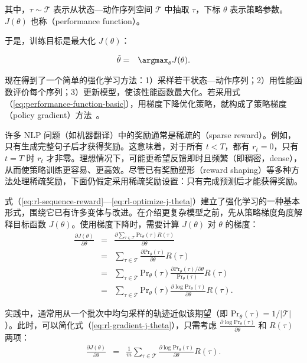 \noindent 其中，$\tau \sim \mathcal{T}$ 表示从状态—动作序列空间 $\mathcal{T}$ 中抽取 $\tau$，下标 $\theta$ 表示策略参数。$J(\theta)$ 也称（performance function）。

于是，训练目标是最大化 $J(\theta)$：

\begin{eqnarray}
\tilde{\theta} & = & \argmax_{\theta} J(\theta). \label{eq:rl-optimize-j-theta}
\end{eqnarray}

现在得到了一个简单的强化学习方法：1）采样若干状态—动作序列；2）用性能函数评价每个序列；3）更新模型，使该性能函数最大化。若采用式（\ref{eq:performance-function-basic}），用梯度下降优化策略，就构成了策略梯度（policy gradient）方法~\cite{williams:1992simple}。

许多 NLP 问题（如机器翻译）中的奖励通常是稀疏的（sparse reward）。例如，只有生成完整句子后才获得奖励。这意味着，对于所有 $t < T$，都有 $r_t = 0$，只有 $t = T$ 时 $r_t$ 才非零。理想情况下，可能更希望反馈即时且频繁（即稠密，dense），从而使策略训练更容易、更高效。尽管已有奖励塑形（reward shaping）等多种方法处理稀疏奖励，下面仍假定采用稀疏奖励设置：只有完成预测后才能获得奖励。

式（\ref{eq:rl-sequence-reward}—\ref{eq:rl-optimize-j-theta}）建立了强化学习的一种基本形式，围绕它已有许多变体与改进。在介绍更复杂模型之前，先从策略梯度角度解释目标函数 $J(\theta)$。使用梯度下降时，需要计算 $J(\theta)$ 对 $\theta$ 的梯度：
\begin{eqnarray}
\frac{\partial J(\theta)}{\partial \theta} & = & \frac{\partial  \sum_{\tau \in \mathcal{T}} \mathrm{Pr}_{\theta}(\tau) R(\tau)}{\partial \theta} \nonumber \\
& = & \sum_{\tau \in \mathcal{T}} \frac{\partial  \mathrm{Pr}_{\theta}(\tau) }{\partial \theta}  R(\tau) \nonumber \\
& = & \sum_{\tau \in \mathcal{T}} \mathrm{Pr}_{\theta}(\tau) \frac{\partial  \mathrm{Pr}_{\theta}(\tau)/\partial \theta}{\mathrm{Pr}_{\theta}(\tau) } R(\tau) \nonumber \\
& = & \sum_{\tau \in \mathcal{T}} \mathrm{Pr}_{\theta}(\tau) \frac{\partial  \log \mathrm{Pr}_{\theta}(\tau) }{\partial \theta} R(\tau). \label{eq:rl-gradient-j-theta}
\end{eqnarray}

实践中，通常用从一个批次中均匀采样的轨迹近似该期望（即 $\mathrm{Pr}_{\theta}(\tau) = 1/|\mathcal{T}|$）。此时，可以简化式（\ref{eq:rl-gradient-j-theta}），只需考虑 $\frac{\partial \log \mathrm{Pr}_{\theta}(\tau)}{\partial \theta}$ 和 $R(\tau)$ 两项：
\begin{eqnarray}
\frac{\partial J(\theta)}{\partial \theta} & = & \frac{1}{m} \sum_{\tau \in \mathcal{T}} \frac{\partial  \log \mathrm{Pr}_{\theta}(\tau)}{\partial \theta} R(\tau). \label{eq:rl-j-theta-gradient-simplified}
\end{eqnarray}

